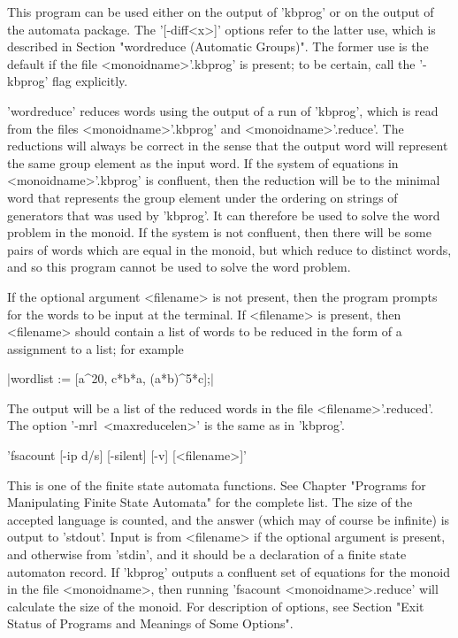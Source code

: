 This program can be used either on the output of 'kbprog' or on the output
of the automata package. The '[-diff<x>]' options refer to the latter use,
which is described in Section
"wordreduce (Automatic Groups)".
The former use is the default if
the file <monoidname>'.kbprog' is present; to be certain, call the
'-kbprog' flag explicitly.

'wordreduce' reduces words using the output of a run of 'kbprog', which is
read from the files <monoidname>'.kbprog' and <monoidname>'.reduce'.
The reductions will always be
correct in the sense that the output word will represent the same group
element as the input word. If the system of equations in <monoidname>'.kbprog'
is confluent, then the reduction will be to the minimal word that represents
the group element under the ordering on strings of generators that was used
by 'kbprog'. It can therefore be used to solve the word problem in the
monoid. If the system is not confluent, then there will be some pairs of words 
which are equal in the monoid, but which reduce to distinct words, and
so this program cannot be used to solve the word problem.

If the optional argument <filename> is not present, then the program prompts
for the words to be input at the terminal. If <filename> is present, then
<filename> should contain a list of words to be reduced in the form of a
{\GAP} assignment to a list; for example\:

|wordlist := [a^20, c*b*a, (a*b)^5*c];|

The output will be a list of the reduced words in the file <filename>'.reduced'.
The option '-mrl\ <maxreducelen>' is the same as in 'kbprog'.


'fsacount  [-ip d/s] [-silent] [-v] [<filename>]'

This is one of the finite state automata functions. See Chapter 
"Programs for Manipulating Finite State Automata" for the complete list.
The size of the accepted language is counted, and the answer (which may
of course be infinite) is output to 'stdout'. Input is from <filename> if
the optional argument is present, and otherwise from 'stdin', and it
should be a declaration of a finite state automaton record.
If 'kbprog' outputs a confluent set of equations for the monoid in the file
<monoidname>, then running 'fsacount <monoidname>.reduce'
will calculate the size of the monoid.
For description of options, see Section
"Exit Status of Programs and Meanings of Some Options".

